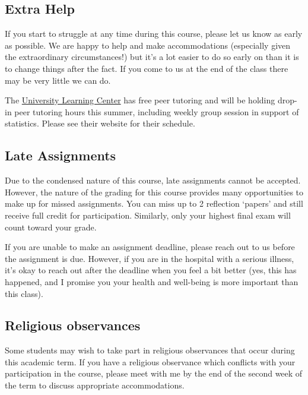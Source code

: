\documentclass[
]{book}
\begin{document}
\hypertarget{extra-help}{%
\subsection{Extra Help}\label{extra-help}}

If you start to struggle at any time during this course, please let us know as early as possible. We are happy to help and make accommodations (especially given the extraordinary circumstances!) but it's a lot easier to do so early on than it is to change things after the fact. If you come to us at the end of the class there may be very little we can do.

The \href{https://www.nyu.edu/students/academic-services/undergraduate-advisement/academic-resource-center/tutoring-and-learning.html}{University Learning Center} has free peer tutoring and will be holding drop-in peer tutoring hours this summer, including weekly group session in support of statistics. Please see their website for their schedule.

\hypertarget{late-assignments}{%
\subsection{Late Assignments}\label{late-assignments}}

Due to the condensed nature of this course, late assignments cannot be accepted. However, the nature of the grading for this course provides many opportunities to make up for missed assignments. You can miss up to 2 reflection `papers' and still receive full credit for participation. Similarly, only your highest final exam will count toward your grade.

If you are unable to make an assignment deadline, please reach out to us before the assignment is due. However, if you are in the hospital with a serious illness, it's okay to reach out after the deadline when you feel a bit better (yes, this has happened, and I promise you your health and well-being is more important than this class).

\hypertarget{religious-observances}{%
\subsection{Religious observances}\label{religious-observances}}

Some students may wish to take part in religious observances that occur during this academic term. If you have a religious observance which conflicts with your participation in the course, please meet with me by the end of the second week of the term to discuss appropriate accommodations.
\end{document}
